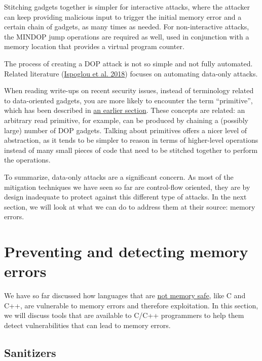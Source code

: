 \documentclass[
  a4paper,
]{report}
\begin{document}
Stitching gadgets together is simpler for interactive attacks, where the
attacker can keep providing malicious input to trigger the initial
memory error and a certain chain of gadgets, as many times as needed.
For non-interactive attacks, the MINDOP jump operations are required as
well, used in conjunction with a memory location that provides a virtual
program counter.

The process of creating a DOP attack is not so simple and not fully
automated. Related literature
(\protect\hyperlink{ref-Ispoglou2018}{Ispoglou et al. 2018}) focuses on
automating data-only attacks.

When reading write-ups on recent security issues, instead of terminology
related to data-oriented gadgets, you are more likely to encounter the
term ``primitive'', which has been described in
\protect\hyperlink{exploitation-primitives}{an earlier section}. These
concepts are related: an arbitrary read primitive, for example, can be
produced by chaining a (possibly large) number of DOP gadgets. Talking
about primitives offers a nicer level of abstraction, as it tends to be
simpler to reason in terms of higher-level operations instead of many
small pieces of code that need to be stitched together to perform the
operations.

To summarize, data-only attacks are a significant concern. As most of
the mitigation techniques we have seen so far are control-flow oriented,
they are by design inadequate to protect against this different type of
attacks. In the next section, we will look at what we can do to address
them at their source: memory errors.

\hypertarget{preventing-and-detecting-memory-errors}{%
\section{Preventing and detecting memory
errors}\label{preventing-and-detecting-memory-errors}}

We have so far discussed how languages that are
\protect\hyperlink{a-bit-of-background-on-memory-vulnerabilities}{not
memory safe}, like C and C++, are vulnerable to memory errors and
therefore exploitation. In this section, we will discuss tools that are
available to C/C++ programmers to help them detect
vulnerabilities that can lead to memory errors.

\hypertarget{sanitizers}{%
\subsection{Sanitizers}\label{sanitizers}}
\end{document}
